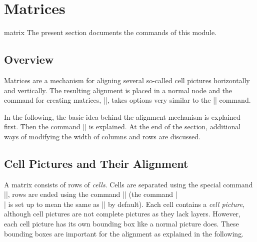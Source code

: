 %
%
%


\section{Matrices}
\label{section-base-matrices}

\begin{pgfmodule}{matrix}
The present section documents the commands of this module.
\end{pgfmodule}

\subsection{Overview}

Matrices are a mechanism for aligning several so-called cell pictures
horizontally and vertically. The resulting alignment is placed in a normal node
and the command for creating matrices, |\pgfmatrix|, takes options very similar
to the |\pgfnode| command.

In the following, the basic idea behind the alignment mechanism is explained
first. Then the command |\pgfmatrix| is explained. At the end of the section,
additional ways of modifying the width of columns and rows are discussed.


\subsection{Cell Pictures and Their Alignment}

A matrix consists of rows of \emph{cells}. Cells are separated using the
special command |\pgfmatrixnextcell|, rows are ended using the command
|\pgfmatrixendrow| (the command |\\| is set up to mean the same as
|\pgfmatrixendrow| by default). Each cell contains a \emph{cell picture},
although cell pictures are not complete pictures as they lack layers. However,
each cell picture has its own bounding box like a normal picture does. These
bounding boxes are important for the alignment as explained in the following.

